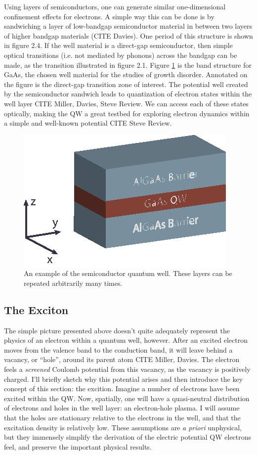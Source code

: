 \indent Using layers of semiconductors, one can generate similar one-dimensional confinement effects for electrons. A simple way this can be done is by sandwiching a layer of low-bandgap semiconductor material in between two layers of higher bandgap materials (CITE Davies). One period of this structure is shown in figure 2.4. If the well material is a direct-gap semiconductor, then simple optical transitions (i.e. not mediated by phonons) across the bandgap can be made, as the transition illustrated in figure 2.1. Figure \ref{GaAsBstruct} is the band structure for GaAs, the chosen well material for the studies of growth disorder. Annotated on the figure is the direct-gap transition zone of interest. The potential well created by the semiconductor sandwich leads to quantization of electron states within the well layer CITE Miller, Davies, Steve Review. We can access each of these states optically, making the QW a great testbed for exploring electron dynamics within a simple and well-known potential CITE Steve Review. 




\begin{figure}[h!]
\centering
\includegraphics[width = .4\textwidth]{Well.eps}
\caption{\doublespacing An example of the semiconductor quantum well. These layers can be repeated arbitrarily many times.}
\label{GaAsBstruct}
\end{figure}

\newpage
\subsection{The Exciton}

\indent The simple picture presented above doesn't quite adequately represent the physics of an electron within a quantum well, however. After an excited electron moves from the valence band to the conduction band, it will leave behind a vacancy, or ``hole'', around its parent atom CITE Miller, Davies. The electron feels a \textit{screened} Coulomb potential from this vacancy, as the vacancy is positively charged. I'll briefly sketch why this potential arises and then introduce the key concept of this section: the excition. Imagine a number of electrons have been excited within the QW. Now, spatially, one will have a quasi-neutral distribution of electrons and holes in the well layer: an electron-hole plasma. I will assume that the holes are stationary relative to the electrons in the well, and that the excitation density is relatively low. These assumptions are \textit{a priori} unphysical, but they immensely simplify the derivation of the electric potential QW electrons feel, and preserve the important physical results. 

